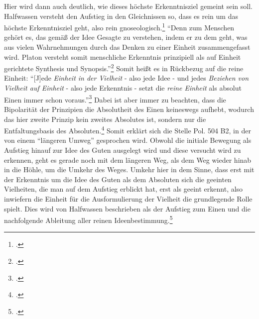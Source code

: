 Hier wird dann auch deutlich, wie dieses höchste Erkenntnisziel gemeint sein soll.
Halfwassen versteht den Aufstieg in den Gleichnissen so, dass es rein um das höchste Erkenntnisziel geht, also rein gnoseologisch.\footcite[vgl.][S. 226]{halfwassenaufstieg2006}
\enquote{Denn zum Menschen gehört es, das gemäß der Idee Gesagte zu verstehen, indem er zu dem geht, was aus vielen Wahrnehmungen durch das Denken zu einer Einheit zusammengefasst wird. Platon versteht somit menschliche Erkenntnis prinzipiell als auf Einheit gerichtete Synthesis und Synopsis.}\footcite[][S. 228]{halfwassenaufstieg2006}
Somit heißt es in Rückbezug auf die reine Einheit:
\enquote{[J]ede \emph{Einheit in der Vielheit} - also jede Idee - und jedes \emph{Beziehen von Vielheit auf Einheit} - also jede Erkenntnis - setzt die \emph{reine Einheit} als absolut Einen immer schon voraus.}\footcite[][S. 230]{halfwassenaufstieg2006}
Dabei ist aber immer zu beachten, dass die Bipolarität der Prinzipien die Absolutheit des Einen keineswegs aufhebt, wodurch das hier zweite Prinzip kein zweites Absolutes ist, sondern nur die Entfaltungsbasis des Absoluten.\footcite[vgl.][S. 53]{HalfwassenGeistmetaphysik}
Somit erklärt sich die Stelle Pol. 504 B2, in der von einem \enquote{längeren Umweg} gesprochen wird. Obwohl die initiale Bewegung als Aufstieg hinauf zur Idee des Guten ausgelegt wird und diese versucht wird zu erkennen, geht es gerade noch mit dem längeren Weg, als dem Weg wieder hinab in die Höhle, um die Umkehr des Weges. Umkehr hier in dem Sinne, dass erst mit der Erkenntnis um die Idee des Guten als dem Absoluten sich die geeinten Vielheiten, die man auf dem Aufstieg erblickt hat, erst als geeint erkennt, also inwiefern die Einheit für die Ausformulierung der Vielheit die grundlegende Rolle spielt. Dies wird von Halfwassen beschrieben als der Aufstieg zum Einen und die nachfolgende Ableitung aller reinen Ideenbestimmung.\footcite[vgl.][S. 231]{halfwassenaufstieg2006} 
